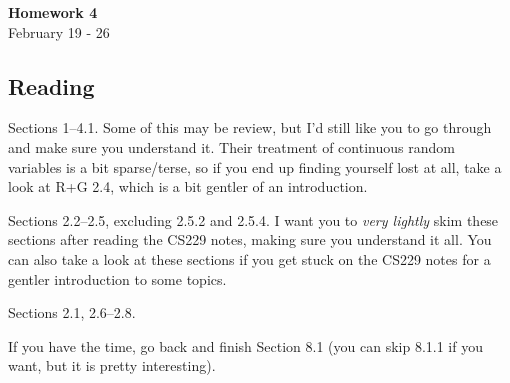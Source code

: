 \documentclass{article}
\newenvironment{envsection}[1]{\begin{trivlist}
\item[\hskip \labelsep {\bfseries #1}]}{\end{trivlist}}
\begin{document}
\setlength{\abovedisplayskip}{4pt}
\setlength{\belowdisplayskip}{4pt}


\begin{center}
    \Large{\textbf{Homework 4}}\\
    \normalsize February 19 - 26
\end{center}
\vspace{10pt}

\subsection*{Reading}




\begin{envsection}{1. CS229 Probability Reference:}
    Sections 1--4.1. Some of this may be review, but I'd still like you to go through and make sure you understand it. Their treatment of continuous random variables is a bit sparse/terse, so if you end up finding yourself lost at all, take a look at R+G 2.4, which is a bit gentler of an introduction.
\end{envsection}

\begin{envsection}{2. Rogers and Girolami:}
    Sections 2.2--2.5, excluding 2.5.2 and 2.5.4. I want you to \textit{very lightly} skim these sections after reading the CS229 notes, making sure you understand it all. You can also take a look at these sections if you get stuck on the CS229 notes for a gentler introduction to some topics.
\end{envsection}

\begin{envsection}{2. Rogers and Girolami:}
    Sections 2.1, 2.6--2.8.
\end{envsection}

\begin{envsection}{3. CS229 Notes:}
    If you have the time, go back and finish Section 8.1 (you can skip 8.1.1 if you want, but it is pretty interesting).
\end{envsection}
\end{document}
